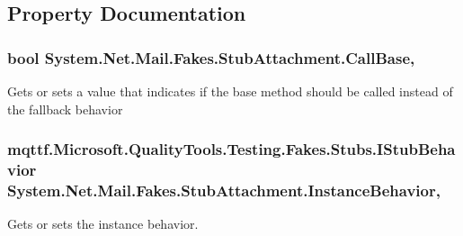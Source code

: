 \subsection{Property Documentation}
\hypertarget{class_system_1_1_net_1_1_mail_1_1_fakes_1_1_stub_attachment_aafb76869634291eb7281bc0c632d2e5b}{
\subsubsection[{Call\-Base}]{\setlength{\rightskip}{0pt plus 5cm}bool System.\-Net.\-Mail.\-Fakes.\-Stub\-Attachment.\-Call\-Base\hspace{0.3cm}{\ttfamily [get]}, {\ttfamily [set]}}}\label{class_system_1_1_net_1_1_mail_1_1_fakes_1_1_stub_attachment_aafb76869634291eb7281bc0c632d2e5b}


Gets or sets a value that indicates if the base method should be called instead of the fallback behavior

\hypertarget{class_system_1_1_net_1_1_mail_1_1_fakes_1_1_stub_attachment_ad9ced4984206c42f7d76e5194a91c317}{
\subsubsection[{Instance\-Behavior}]{\setlength{\rightskip}{0pt plus 5cm}mqttf.\-Microsoft.\-Quality\-Tools.\-Testing.\-Fakes.\-Stubs.\-I\-Stub\-Behavior System.\-Net.\-Mail.\-Fakes.\-Stub\-Attachment.\-Instance\-Behavior\hspace{0.3cm}{\ttfamily [get]}, {\ttfamily [set]}}}\label{class_system_1_1_net_1_1_mail_1_1_fakes_1_1_stub_attachment_ad9ced4984206c42f7d76e5194a91c317}


Gets or sets the instance behavior.

